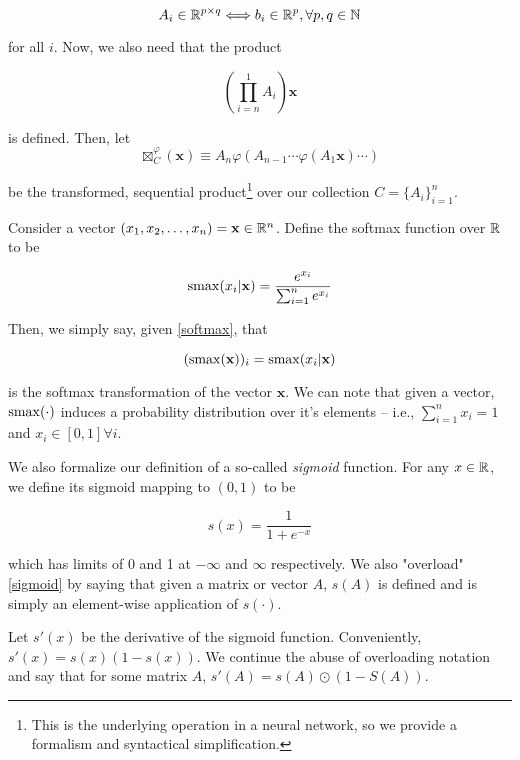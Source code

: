 \begin{equation}
\label{condition on dimensions}
A_i \in\mathbb{R}^{p\times q} \Longleftrightarrow b_i\in\mathbb{R}^{p}, \forall p,q\in\mathbb{N}
\end{equation}

for all $i$. Now, we also need that the product

\begin{equation}
\label{condition on product}
(\prod_{i=n}^{1} A_i ) \mathbf{x}
\end{equation}


is defined. Then, let
\begin{equation}
\label{network_operator}
\boxtimes_{C}^{\varphi} ( \mathbf{x} ) \equiv  A_n \varphi( A_{n-1}\cdots \varphi(A_1 \mathbf{x}) \cdots )
\end{equation}


be the transformed, sequential product\footnote{This is the underlying operation in a neural network, so we provide a formalism and syntactical simplification.} over our collection $C=\{ A_i \}_{i=1}^{n}$. 

Consider a vector $(x_1,x_2,\ldots,x_n)=\mathbf{x}\in\mathbb{R}^{n}$. Define the softmax function over $\mathbb{R}$ to be 


\begin{equation}
\label{softmax}
\mathrm{smax}(x_i | \mathbf{x}) = \frac{e^{x_i}}{ \sum_{i = 1}^{n} e^{x_i} }
\end{equation}

Then, we simply say, given \eqref{softmax}, that 

$$ (\mathrm{smax}(\mathbf{x}))_i =  \mathrm{smax}(x_i | \mathbf{x})  $$

is the softmax transformation of the vector $\mathbf{x}$. We can note that given a vector, $\mathrm{smax}(\cdot)$ induces a probability distribution over it's elements -- i.e., $\sum_{i=1}^{n}x_i = 1$ and $x_i\in[0,1]\forall i$.

We also formalize our definition of a so-called \emph{sigmoid} function. For any $x\in\mathbb{R}$, we define its sigmoid mapping to $(0,1)$ to be 

\begin{equation}
\label{sigmoid}
s(x) = \frac{1}{1+e^{-x}}
\end{equation}

which has limits of 0 and 1 at $-\infty$ and $\infty$ respectively. We also "overload" \eqref{sigmoid} by saying that given a matrix or vector $A$, $s(A)$ is defined and is simply an element-wise application of $s(\cdot)$.

Let $s'(x)$ be the derivative of the sigmoid function. Conveniently, $s'(x) = s(x)(1 - s(x))$. We continue the abuse of overloading notation and say that for some matrix $A$, $s'(A) = s(A)\odot (1 - S(A))$.


